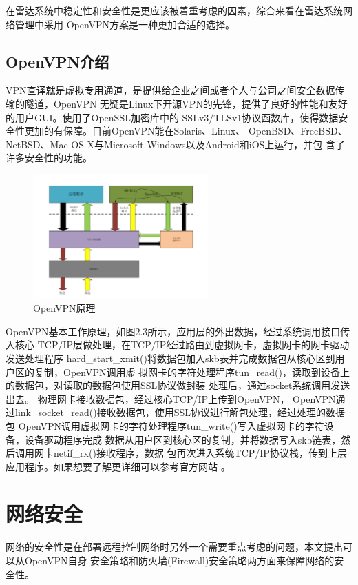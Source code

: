 \documentclass[a4paper,12pt]{report}
\begin{document}
在雷达系统中稳定性和安全性是更应该被着重考虑的因素，综合来看在雷达系统网络管理中采用
OpenVPN方案是一种更加合适的选择。

\section{OpenVPN介绍}
VPN直译就是虚拟专用通道，是提供给企业之间或者个人与公司之间安全数据传输的隧道，OpenVPN
无疑是Linux下开源VPN的先锋，提供了良好的性能和友好的用户GUI。使用了OpenSSL加密库中的
SSLv3/TLSv1协议函数库，使得数据安全性更加的有保障。目前OpenVPN能在Solaris、Linux、
OpenBSD、FreeBSD、NetBSD、Mac OS X与Microsoft Windows以及Android和iOS上运行，并包
含了许多安全性的功能。

\begin{figure}[hbtp]
	\centering
	\includegraphics [width=0.6\textwidth]{figure//VPNPrince.pdf}
	\caption{OpenVPN原理}\label{VPNPrince}
\end{figure}

OpenVPN基本工作原理，如图2.3所示，应用层的外出数据，经过系统调用接口传入核心
TCP/IP层做处理，在TCP/IP经过路由到虚拟网卡，虚拟网卡的网卡驱动发送处理程序
hard\_start\_xmit()将数据包加入skb表并完成数据包从核心区到用户区的复制，OpenVPN调用虚
拟网卡的字符处理程序tun\_read()，读取到设备上的数据包，对读取的数据包使用SSL协议做封装
处理后，通过socket系统调用发送出去。 物理网卡接收数据包，经过核心TCP/IP上传到OpenVPN，
OpenVPN通过link\_socket\_read()接收数据包，使用SSL协议进行解包处理，经过处理的数据包
OpenVPN调用虚拟网卡的字符处理程序tun\_write()写入虚拟网卡的字符设备，设备驱动程序完成
数据从用户区到核心区的复制，并将数据写入skb链表，然后调用网卡netif\_rx()接收程序，数据
包再次进入系统TCP/IP协议栈，传到上层应用程序。如果想要了解更详细可以参考官方网站
\cite{OpenVPN.web}。


\chapter{网络安全}
网络的安全性是在部署远程控制网络时另外一个需要重点考虑的问题，本文提出可以从OpenVPN自身
安全策略和防火墙(Firewall)安全策略两方面来保障网络的安全性。
\end{document}
